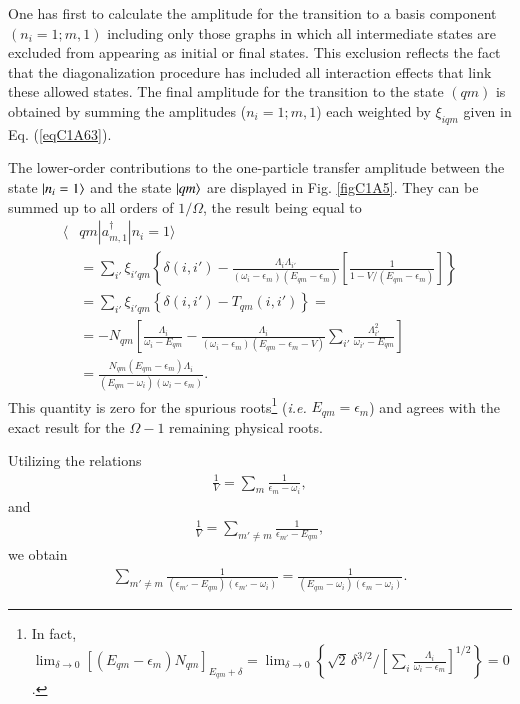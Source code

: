 One has  first to calculate the amplitude for the transition to a basis component $(n_i= 1; m, 1)$ including only those graphs in which all intermediate states are excluded from appearing as initial or final states. This exclusion reflects the fact that the diagonalization procedure has included all interaction effects that link these allowed states. The final amplitude for the transition to the state $(qm)$ is obtained by summing the amplitudes  ($n_i=1;m,1$) each weighted by  $\xi_{iqm}$ given in Eq. (\ref{eqC1A63}). 

The lower-order contributions to the one-particle transfer amplitude between the state $|{n_i=1} \rangle$ and the state $|{qm} \rangle$ are displayed in Fig. \ref{figC1A5}. They can be summed up to all orders of $1/\Omega$, the result being equal to 
  \begin{align}\label{eqC1A73} 
   \nonumber \langle & qm|a^\dagger_{m,1}|n_i=1\rangle\\
\nonumber &=\sum_{i'}\xi_{i'qm}\left\{\delta(i,i')-\frac{\Lambda_i\Lambda_{i'}}{(\omega_i-\epsilon_m)(E_{qm}-\epsilon_m)}\left[\frac{1}{1-V/(E_{qm}-\epsilon_m)}\right]\right\}\\
\nonumber &=\sum_{i'}\xi_{i'qm}\left\{\delta(i,i')-T_{qm}(i,i')\right\}=\\
\nonumber & =-N_{qm}\left[\frac{\Lambda_i}{\omega_i-E_{qm}}-\frac{\Lambda_i}{(\omega_i-\epsilon_m)(E_{qm}-\epsilon_m-V)}\sum_{i'}\frac{\Lambda_{i'}^2}{\omega_{i'}-E_{qm}}\right]\\
&=\frac{N_{qm}(E_{qm}-\epsilon_m)\Lambda_i}{(E_{qm}-\omega_i)(\omega_i-\epsilon_m)}.
\end{align} 
This quantity is zero for the spurious roots\footnote{In fact, $\lim_{\delta\to0}[(E_{qm}-\epsilon_m)N_{qm}]_{E_{qm}+\delta}=\lim_{\delta\to0}\left\{\sqrt{2}\,\delta^{3/2}/[\sum_i\frac{\Lambda_i}{\omega_i-\epsilon_m}]^{1/2}\right\}=0$.} (\textit{i.e.} $E_{qm}=\epsilon_m$) and agrees with the exact result for the $\Omega-1$ remaining physical roots. 


Utilizing the relations
  \begin{align}\label{eqC1A74} 
  \frac{1}{V}=\sum_m\frac{1}{\epsilon_m-\omega_i},
    \end{align}  
and  
  \begin{align}\label{eqC1A75} 
   \frac{1}{V}=\sum_{m'\neq m}\frac{1}{\epsilon_{m'}-E_{qm}},
    \end{align} 
we  obtain  
  \begin{align}\label{eqC1A76} 
   \sum_{m'\neq m}\frac{1}{(\epsilon_{m'}-E_{qm})(\epsilon_{m'}-\omega_i)}=\frac{1}{(E_{qm}-\omega_i)(\epsilon_m-\omega_i)}.
    \end{align} 

